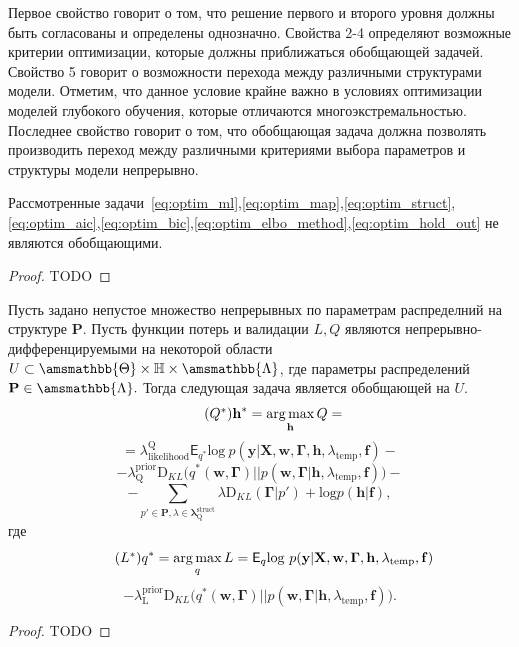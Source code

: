 Первое свойство говорит о том, что решение первого и второго уровня должны быть согласованы и определены однозначно.
Свойства 2-4 определяют возможные критерии оптимизации, которые должны приближаться обобщающей задачей.
Свойство 5 говорит о возможности перехода между различными структурами модели. Отметим, что данное условие крайне важно в условиях оптимизации моделей глубокого обучения, которые отличаются многоэкстремальностью.
Последнее свойство говорит о том, что обобщающая задача должна позволять производить переход между различными критериями выбора  параметров и структуры модели непрерывно.

\begin{theorem}Рассмотренные задачи~\eqref{eq:optim_ml},\eqref{eq:optim_map},\eqref{eq:optim_struct},\eqref{eq:optim_aic},\eqref{eq:optim_bic},\eqref{eq:optim_elbo_method},\eqref{eq:optim_hold_out} не являются обобщающими.
\end{theorem}
\begin{proof}
TODO
\end{proof}

\begin{theorem}
Пусть задано непустое множество непрерывных по параметрам распределний на структуре $\mathbf{P}$. 
Пусть функции потерь и валидации $L,Q$ являются непрерывно-дифференцируемыми на некоторой области $U\subset \amsmathbb{\Theta} \times \mathbb{H} \times \amsmathbb{\Lambda}$, где параметры распределений $\mathbf{P} \in \amsmathbb{\Lambda}.$ 
Тогда следующая задача является обобщающей на $U$.
\begin{equation}
\tag{$Q^{*}$}
\label{eq:qopt}
\mathbf{h}^{*} = \argmax_{\mathbf{h}} Q = 
\end{equation}
\[
= {\lambda_\text{likelihood}^\text{Q}\mathsf{E}_{{q}^{*}} \text{log}~{p(\mathbf{y} | \mathbf{X}, \mathbf{w},\boldsymbol{\Gamma}, \mathbf{h}, \lambda_\text{temp}, \mathbf{f})}}
 -\]
\vspace{-0.3cm}
\[- {\lambda^\text{prior}_\text{Q}\text{D}_{KL}\bigl( q^{*}(\mathbf{w}, \boldsymbol{\Gamma}) || p(\mathbf{w}, \boldsymbol{\Gamma} |\mathbf{h}, \lambda_{\text{temp}},\mathbf{f}) \bigr)}  -\]
\vspace{-0.3cm}
\[
 - {\sum_{p' \in \mathbf{P}, \lambda \in \boldsymbol{\lambda}^\text{struct}_\text{Q}} \lambda\text{D}_{KL}(\boldsymbol{\Gamma} | p') + \text{log}p(\mathbf{h}|\mathbf{f})}, 
\]
где 
\begin{equation}
\tag{$L^{*}$}
{q}^{*} = \argmax_{q} L = 
{\mathsf{E}_q \text{log}~{p(\mathbf{y} | \mathbf{X}, \mathbf{w}, \boldsymbol{\Gamma}, \mathbf{h}, \lambda_{\text{temp}}, \mathbf{f})}}
\end{equation}
\vspace{-0.3cm}
\[- {\lambda^\text{prior}_\text{L}\text{D}_{KL}\bigl( q^{*}(\mathbf{w}, \boldsymbol{\Gamma}) || p(\mathbf{w}, \boldsymbol{\Gamma} |\mathbf{h}, \lambda_{\text{temp}},\mathbf{f}) \bigr)}.
\]
\end{theorem}
\begin{proof}
TODO
\end{proof}

